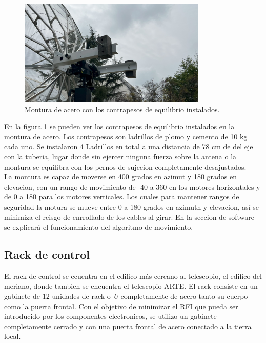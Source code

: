 \begin{figure}
    \centering
    \includegraphics[width=0.8\textwidth]{img/contrapesos}
    \caption{Montura de acero con los contrapesos de equilibrio instalados.}
    \label{fig:ensamble11}
\end{figure}

En la figura \ref{fig:ensamble11} se pueden ver los contrapesos de equilibrio instalados en la montura de acero. Los contrapesos son ladrillos de plomo y cemento de 10 kg cada uno. Se instalaron 4 Ladrillos en total a una distancia de 78 cm de del eje con la tuberia, lugar donde sin ejercer ninguna fuerza sobre la antena o la montura se equilibra con los pernos de sujecion completamente desajustados.\\

La montura es capaz de moverse en 400 grados en azimut y 180 grados en elevacion, con un rango de movimiento de -40 a 360 en los motores horizontales y de 0 a 180 para los motores verticales. Los cuales para mantener rangos de seguridad la motura se mueve entre 0 a 180 grados en azimuth y elevacion, así se minimiza el reisgo de enrrollado de los cables al girar. En la seccion de software se explicará el funcionamiento del algoritmo de movimiento.\\

\subsection{Rack de control}

El rack de control se ecuentra en el edifico más cercano al telescopio, el edifico del meriano, donde tambien se encuentra el telescopio ARTE. El rack consiste en un gabinete de 12 unidades de rack o \textit{U} completamente de acero tanto su cuerpo como la puerta frontal. Con el objetivo de minimizar el RFI que pueda ser introducido por los componentes electronicos, se utilizo un gabinete completamente cerrado y con una puerta frontal de acero conectado a la tierra local.\\


